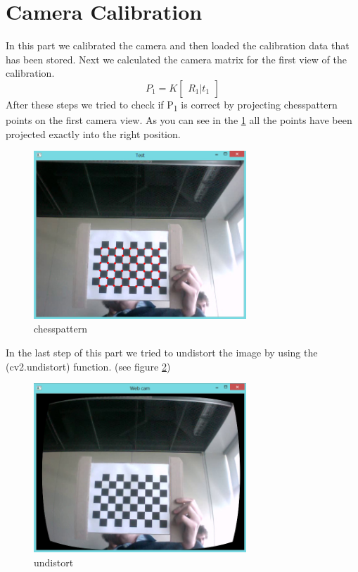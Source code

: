 \section{Camera Calibration}
In this part we calibrated the camera and then loaded the calibration data that has been stored. Next we calculated the camera matrix for the first view of the calibration.
\begin{equation}
	P_{1} = K
	\begin{bmatrix} R_{1}|t_{1} \end{bmatrix}
\end{equation}
 After these steps we tried to check if P\textsubscript{1} is correct by projecting chesspattern points on the first camera view. As you can see in the \ref{fig:chesspattern} all the points have been projected exactly into the right position.
 
 \begin{figure}[h!]
	\centering
	\includegraphics[width=8cm]{Handin3/images/patterndot.jpg}
	\caption{chesspattern}
	\label{fig:chesspattern}
\end{figure}
 
 In the last step of this part we tried to undistort the image by using the (cv2.undistort) function. (see figure \ref{fig:undistort})
 
 \begin{figure}[h!]
	\centering
	\includegraphics[width=8cm]{Handin3/images/undistort.jpg}
	\caption{undistort}
	\label{fig:undistort}
\end{figure}
 

